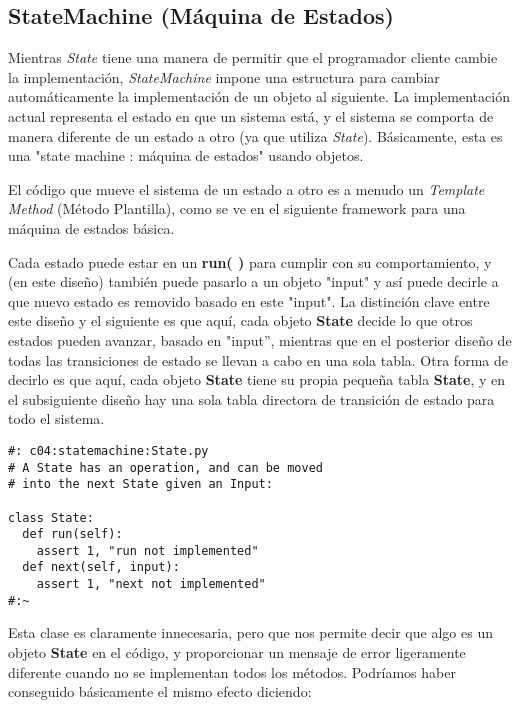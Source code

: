\newpage

\subsection*{StateMachine (Máquina de Estados)}
\label{subsec:sm}


Mientras \textit{State} tiene una manera de permitir que el programador cliente cambie la implementación, \textit{StateMachine} impone una estructura para cambiar automáticamente la implementación de un objeto al siguiente. La implementación actual representa el estado en que un sistema está, y el sistema se comporta de manera diferente de un estado a otro (ya que utiliza \textit{State}). Básicamente, esta es una "state machine : máquina de estados" usando objetos.     \newline

El código que mueve el sistema de un estado a otro es a menudo un \textit{Template Method} (Método Plantilla), como se ve en el siguiente framework para una máquina de estados básica.    \newline

Cada estado puede estar en un \textbf{run( )} para cumplir con su comportamiento, y (en este diseño) también puede pasarlo a un objeto "input" y así puede decirle a que nuevo estado es removido basado en este "input".
La distinción clave entre este diseño y el siguiente es que aquí, cada objeto \textbf{State} decide lo que otros estados pueden avanzar, basado en "input”, mientras que en el posterior diseño de todas las transiciones de estado se llevan a cabo en una sola tabla. Otra forma de decirlo es que aquí, cada objeto \textbf{State} tiene su propia pequeña tabla \textbf{State}, y en el subsiguiente diseño hay una sola tabla directora de transición de estado para todo el sistema.   \newline

 \begin{lstlisting}
#: c04:statemachine:State.py 
# A State has an operation, and can be moved 
# into the next State given an Input: 

class State: 
  def run(self):  
    assert 1, "run not implemented" 
  def next(self, input): 
    assert 1, "next not implemented" 
#:~ 
 \end{lstlisting}
 
 Esta clase es claramente innecesaria, pero que nos permite decir que algo es un objeto \textbf{State} en el código, y proporcionar un mensaje de error ligeramente diferente cuando no se implementan todos los métodos. Podríamos haber conseguido básicamente el mismo efecto diciendo:      \newline
 
